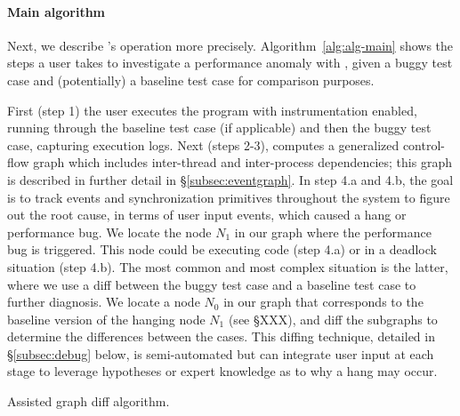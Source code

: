 \paragraph{Main algorithm} Next, we describe \xxx's operation more precisely.
Algorithm~\ref{alg:alg-main} shows the steps a user takes to investigate a
performance anomaly with \xxx, given a buggy test case and (potentially) a
baseline test case for comparison purposes.

First (step 1) the user executes the program with \xxx instrumentation enabled,
running through the baseline test case (if applicable) and then the buggy test
case, capturing execution logs. Next (steps 2-3), \xxx computes a generalized
control-flow graph which includes inter-thread and inter-process dependencies;
this graph is described in further detail in \S\ref{subsec:eventgraph}. In step
4.a and 4.b, the goal is to track events and synchronization primitives
throughout the system to figure out the root cause, in terms of user input
events, which caused a hang or performance bug. We locate the node $N_1$ in our
graph where the performance bug is triggered. This node could be executing code
(step 4.a) or in a deadlock situation (step 4.b). The most common and most
complex situation is the latter, where we use a diff between the buggy test
case and a baseline test case to further diagnosis. We locate a node $N_0$ in
our graph that corresponds to the baseline version of the hanging node $N_1$
(see \S XXX), and diff the subgraphs to determine the differences between the
cases. This diffing technique, detailed in \S\ref{subsec:debug} below, is
semi-automated but can integrate user input at each stage to leverage
hypotheses or expert knowledge as to why a hang may occur.


\begin{algorithm}[ht!]
    \caption{\xxx Assisted graph diff algorithm.}
    \label{alg:alg-graphdiff}
\begin{algorithmic}[1]
\Statex
{}
	\EndIf
	\EndIf
\EndFor
{}
\EndFunction
\end{algorithmic}
\end{algorithm}

